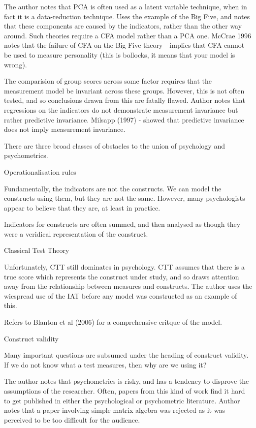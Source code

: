 The author notes that PCA is often used as a latent variable technique, when in fact it is a data-reduction technique. 
Uses the example of the Big Five, and notes that these components are caused by the indicators, rather than the other way around.
Such theories require a CFA model rather than a PCA one.
McCrae 1996 notes that the failure of CFA on the Big Five theory - implies that CFA cannot be used to measure personality (this is bollocks, it means that your model is wrong).

The comparision of group scores across some factor requires that the measurement model be invariant across these groups. However, this is not often tested, and so conclusions drawn from this are fatally flawed.
Author notes that regressions on the indicators do not demonstrate measurement invariance but rather predictive invariance.
Milsapp (1997) - showed that predictive invariance does not imply measurement invariance.

There are three broad classes of obstacles to the union of psychology and psychometrics.

Operationalisation rules

Fundamentally, the indicators are not the constructs. We can model the constructs using them, but they are not the same. However, many psychologists appear to believe that they are, at least in practice.

Indicators for constructs are often summed, and then analysed as though they were a veridical representation of the construct.

Classical Test Theory

Unfortunately, CTT still dominates in psychology. CTT assumes that there is a true score which represents the construct under study, and so draws attention away from the relationship between measures and constructs. 
The author uses the wiespread use of the IAT before any model was constructed as an example of this.

Refers to Blanton et al (2006) for a comprehensive critque of the model.

Construct validity

Many important questions are subsumed under the heading of construct validity.
If we do not know what a test measures, then why are we using it?

The author notes that psychometrics is risky, and has a tendency to disprove the assumptions of the researcher.
Often, papers from this kind of work find it hard to get published in either the psychological or psychometric literature.
Author notes that a paper involving simple matrix algebra was rejected as it was perceived to be too difficult for the audience.

